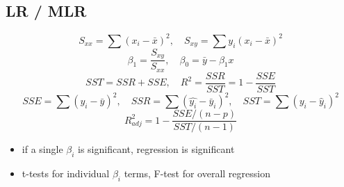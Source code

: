 \documentclass{article}
\begin{document}
\begin{multicols*}{2}
\section{LR / MLR}
$$S_{xx} = \sum (x_i - \bar{x})^2, \quad S_{xy} = \sum y_i(x_i - \bar{x})^2$$
$$\beta_1 = \frac{S_{xy}}{S_{xx}}, \quad \beta_0 = \bar{y} - \beta_1 x$$
$$ SST = SSR + SSE, \quad R^2 = \frac{SSR}{SST} = 1- \frac{SSE}{SST}$$
$$ SSE = \sum(y_i - \bar{y})^2, \quad SSR = \sum(\hat{y_i} - \bar{y}_i)^2, \quad SST = \sum(y_i - \hat{y}_i)^2$$
$$ R^2_{adj} = 1 - \frac{SSE / (n-p)}{SST/(n-1)}$$
\begin{itemize}
    \setlength\itemsep{0em}
    \item if a single $\beta_i$ is significant, regression is significant
    \item t-tests for individual $\beta_i$ terms, F-test for overall regression
\end{itemize}


\end{multicols*}
\end{document}
